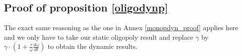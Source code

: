 \begin{subappendices}
\section{Proof of proposition \ref{oligodynp}}\label{oligodyn_proof}

The exact same reasoning as the one in Annex \ref{monopdyn_proof} applies here and we only have to take our static oligopoly result and replace  $\gamma$ by $\gamma \cdot \left( 1+ \frac{\tau}{\omega}\frac{d\omega}{dt}\right)$ to obtain the dynamic results.













%
%
%

\end{subappendices}
